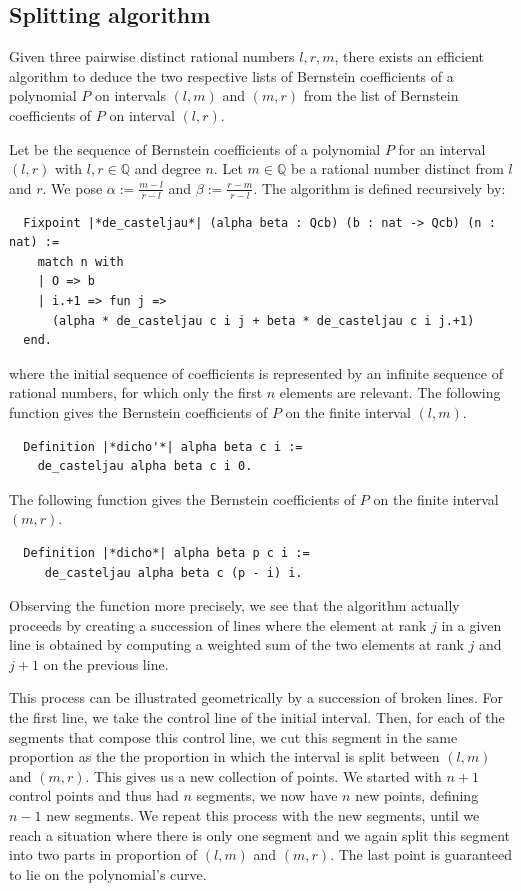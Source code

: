 \documentclass{mscs}
\begin{document}
\subsection{Splitting algorithm}\label{ssec:split}

Given three pairwise distinct rational numbers $l, r, m$,
there exists an efficient algorithm to deduce the two respective lists
of Bernstein coefficients of a polynomial $P$ on intervals $(l, m)$
and $(m, r)$ from the list of Bernstein coefficients of $P$ on
interval $(l, r)$.

Let  be the sequence of Bernstein coefficients of a polynomial $P$
for an interval \((l,r)\) with \(l, r\in \mathbb{Q}\) and degree \(n\).
Let $m\in \mathbb{Q}$ be a rational number
distinct from $l$ and $r$. We pose
$\alpha := \frac{m - l}{r - l}$ and $\beta := \frac{r - m}{r - l}$. The
 algorithm is defined recursively by:
\begin{lstlisting}
  Fixpoint |*de_casteljau*| (alpha beta : Qcb) (b : nat -> Qcb) (n : nat) :=
    match n with
    | O => b
    | i.+1 => fun j =>
      (alpha * de_casteljau c i j + beta * de_casteljau c i j.+1)
  end.
\end{lstlisting}
where the initial sequence of coefficients  is represented by an
infinite sequence of rational numbers, for which only the first $n$
elements are relevant.  The following function gives the Bernstein
coefficients of \(P\) on the finite interval \((l,m)\).
\begin{lstlisting}
  Definition |*dicho'*| alpha beta c i :=
    de_casteljau alpha beta c i 0.
\end{lstlisting}
The following function gives the Bernstein coefficients of \(P\) on the
finite interval \((m,r)\).
\begin{lstlisting}
  Definition |*dicho*| alpha beta p c i :=
     de_casteljau alpha beta c (p - i) i.
\end{lstlisting}

Observing the function 
more precisely, we see that the algorithm actually
proceeds by creating a succession of lines where the element at rank
\(j\) in a given line is obtained by computing a weighted sum of the two
elements at rank \(j\) and \(j+1\) on the previous line.

This process can be illustrated geometrically by a succession of broken
lines.
For the first line, we take the control line of the initial
interval.  Then, for each of the segments that compose this control line,
we cut this segment in the same proportion as the the proportion in which
the interval is split between \((l,m)\) and \((m,r)\).  This gives us
a new collection of points.  We started with \(n + 1\) control points and
thus had \(n\) segments, we now have \(n\) new points, defining \(n-1\)
new segments.  We repeat this process with the new segments, until we reach
a situation where there is only one segment and we again split this
segment into two parts in proportion of \((l,m)\) and \((m,r)\).  The
last point is guaranteed to lie on the polynomial's curve.
\end{document}
